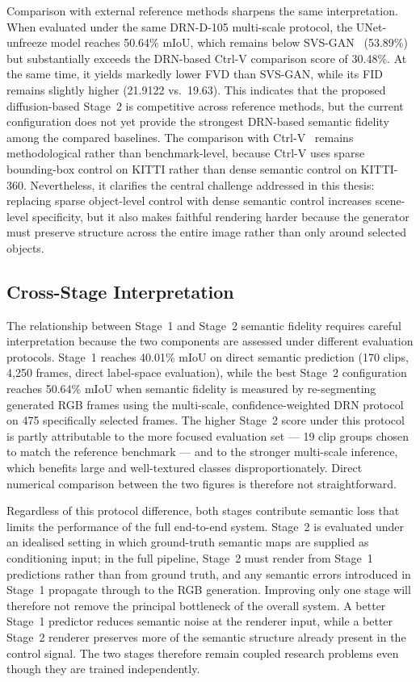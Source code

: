 Comparison with external reference methods sharpens the same interpretation. When evaluated under the same DRN-D-105 multi-scale protocol, the UNet-unfreeze model reaches 50.64\% mIoU, which remains below SVS-GAN~\cite{seyam2024svsgan} (53.89\%) but substantially exceeds the DRN-based Ctrl-V comparison score of 30.48\%. At the same time, it yields markedly lower FVD than SVS-GAN, while its FID remains slightly higher (21.9122 vs.\ 19.63). This indicates that the proposed diffusion-based Stage~2 is competitive across reference methods, but the current configuration does not yet provide the strongest DRN-based semantic fidelity among the compared baselines. The comparison with Ctrl-V~\cite{luo2025ctrlv} remains methodological rather than benchmark-level, because Ctrl-V uses sparse bounding-box control on KITTI rather than dense semantic control on KITTI-360. Nevertheless, it clarifies the central challenge addressed in this thesis: replacing sparse object-level control with dense semantic control increases scene-level specificity, but it also makes faithful rendering harder because the generator must preserve structure across the entire image rather than only around selected objects.

\subsection{Cross-Stage Interpretation}
\label{subsec:cross_stage_discussion}

The relationship between Stage~1 and Stage~2 semantic fidelity requires careful interpretation because the two components are assessed under different evaluation protocols. Stage~1 reaches 40.01\% mIoU on direct semantic prediction (170 clips, 4{,}250 frames, direct label-space evaluation), while the best Stage~2 configuration reaches 50.64\% mIoU when semantic fidelity is measured by re-segmenting generated RGB frames using the multi-scale, confidence-weighted DRN protocol on 475 specifically selected frames. The higher Stage~2 score under this protocol is partly attributable to the more focused evaluation set — 19 clip groups chosen to match the reference benchmark — and to the stronger multi-scale inference, which benefits large and well-textured classes disproportionately. Direct numerical comparison between the two figures is therefore not straightforward.

Regardless of this protocol difference, both stages contribute semantic loss that limits the performance of the full end-to-end system. Stage~2 is evaluated under an idealised setting in which ground-truth semantic maps are supplied as conditioning input; in the full pipeline, Stage~2 must render from Stage~1 predictions rather than from ground truth, and any semantic errors introduced in Stage~1 propagate through to the RGB generation. Improving only one stage will therefore not remove the principal bottleneck of the overall system. A better Stage~1 predictor reduces semantic noise at the renderer input, while a better Stage~2 renderer preserves more of the semantic structure already present in the control signal. The two stages therefore remain coupled research problems even though they are trained independently.

